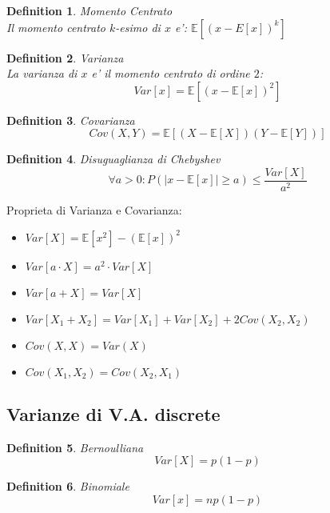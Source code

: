 \documentclass{article}
\newtheorem{definition}{Definition}[section]
\begin{document}
    \begin{definition} Momento Centrato \\
        Il momento centrato $k$-esimo di $x$ e': $\mathbb E[(x-E[x])^k]$ 
    \end{definition}

    \begin{definition} Varianza \\
        La varianza di $x$ e' il momento centrato di ordine $2$: 
        $$ Var[x] = \mathbb E[(x-\mathbb E[x])^2]$$
    \end{definition}

    \begin{definition} Covarianza \\
        $$
        Cov(X,Y) = \mathbb E[(X- \mathbb E[X])(Y - \mathbb E[Y])]
        $$
    \end{definition}

    \begin{definition} Disuguaglianza di Chebyshev
        $$
        \forall a > 0: P(|x-\mathbb E[x]| \geq a) \leq \frac{Var[X]}{a^2}
        $$
    \end{definition}

    Proprieta di Varianza e Covarianza:
    \begin{itemize}
        \item $Var[X] = \mathbb E[x^2] - (\mathbb E[x])^2$
        \item $Var[a \cdot X] = a^2 \cdot Var[X]$
        \item $Var[a+X] = Var[X]$
        \item $Var[X_1 + X_2] = Var[X_1] + Var[X_2] + 2 Cov(X_2, X_2)$
        \item $Cov(X,X) = Var(X)$
        \item $Cov(X_1, X_2) = Cov(X_2, X_1)$
    \end{itemize}

    \subsection{Varianze di V.A. discrete}
    \begin{definition} Bernoulliana
        $$
        Var[X] = p(1-p)
        $$
    \end{definition}

    \begin{definition} Binomiale
        $$
        Var[x] = np(1-p)
        $$
    \end{definition}
\end{document}
